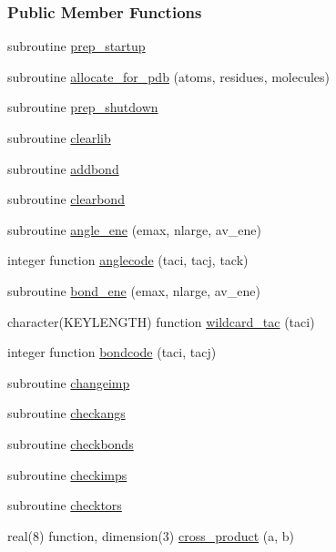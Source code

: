 \subsubsection*{Public Member Functions}
\begin{DoxyCompactItemize}
\item 
subroutine \hyperlink{classprep_a09769dae7cb5df79a430d07e240fb16b}{prep\-\_\-startup}
\item 
subroutine \hyperlink{classprep_a5f21f991d15abcd5c2924e5b0c336150}{allocate\-\_\-for\-\_\-pdb} (atoms, residues, molecules)
\item 
subroutine \hyperlink{classprep_a980bbec7c9f236072dd12ff9ad79415e}{prep\-\_\-shutdown}
\item 
subroutine \hyperlink{classprep_a178e327edc517c88f0c9b73deaea4ea5}{clearlib}
\item 
subroutine \hyperlink{classprep_acadfec11c64fcb6b270659df6eda3423}{addbond}
\item 
subroutine \hyperlink{classprep_a24b3ed27b340b275c00ec436ee42f541}{clearbond}
\item 
subroutine \hyperlink{classprep_a5b47d59f9e81a2b2ef38e462a396bb5e}{angle\-\_\-ene} (emax, nlarge, av\-\_\-ene)
\item 
integer function \hyperlink{classprep_ac73d54cb63e87af1514bf46d1b083d6b}{anglecode} (taci, tacj, tack)
\item 
subroutine \hyperlink{classprep_acaccf4ef0504c7bebef36bdd5a6bfc1f}{bond\-\_\-ene} (emax, nlarge, av\-\_\-ene)
\item 
character(K\-E\-Y\-L\-E\-N\-G\-T\-H) function \hyperlink{classprep_a794267b8fc71dc3627e499ead4d46036}{wildcard\-\_\-tac} (taci)
\item 
integer function \hyperlink{classprep_ab06305b2cf8d811511432d82e368ce92}{bondcode} (taci, tacj)
\item 
subroutine \hyperlink{classprep_ad6bd84f0763211bf5153b296e98f8eb8}{changeimp}
\item 
subroutine \hyperlink{classprep_a7ac174f5565d619eba52fbd3857ecc09}{checkangs}
\item 
subroutine \hyperlink{classprep_a8d372a19058ff7689d991fd5a1926c3c}{checkbonds}
\item 
subroutine \hyperlink{classprep_a61d9fe11fd8e2fcacee27aed5b2d03df}{checkimps}
\item 
subroutine \hyperlink{classprep_a78d4b6ccd1cf10b70d165ca709f2a1a3}{checktors}
\item 
real(8) function, dimension(3) \hyperlink{classprep_a441b1a4d5250639ed72f5d07555a18bd}{cross\-\_\-product} (a, b)

\end{DoxyCompactItemize}
